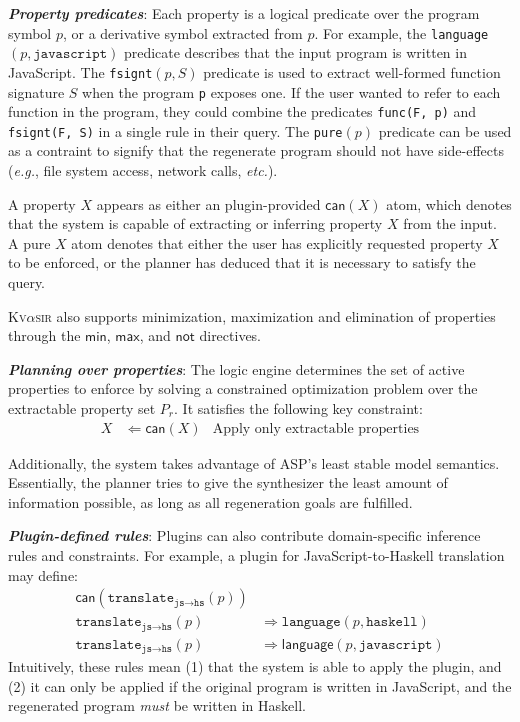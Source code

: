 \documentclass[nonacm,sigplan,review]{acmart}
\def\eg{{\em e.g.}, }
\def\etc{{\em etc.}\xspace}
\newcommand{\sys}{{\scshape Kv{$\alpha$}sir}\xspace}
\newcommand{\heading}[1]{\vspace{2pt}\noindent\textbf{\emph{#1}}:\enspace}
\newcommand{\ttt}[1]{\texttt{#1}\xspace}
\begin{document}



\heading{Property predicates}
Each property is a logical predicate over the program symbol $p$,
or a derivative symbol extracted from $p$.
For example, 
the \ttt{language}$(p, \ttt{javascript})$ predicate describes that the input program is written in JavaScript.
The \ttt{fsignt}$(p, S)$ predicate is used to extract well-formed function signature $S$ when the program \ttt{p} exposes one.
If the user wanted to refer to each function in the program, they could 
combine the predicates \ttt{func(F, p)} and \ttt{fsignt(F, S)} in a single rule in their query.
The \ttt{pure}$(p)$ predicate can be used as a contraint
to signify that the regenerate program
should not have side-effects (\eg file system access, network calls, \etc).

A property $X$ appears as either an
  plugin-provided $\mathsf{can}(X)$ atom, which denotes that the system is capable of extracting or inferring property $X$ from the input.
  A pure $X$ atom denotes that either the user has explicitly requested property $X$ to be enforced, or the planner has deduced that it is necessary to satisfy the query.

\sys also supports minimization, maximization and elimination of properties
through the $\mathsf{min}$, $\mathsf{max}$, and $\mathsf{not}$ directives.

\heading{Planning over properties}
The logic engine determines the set of active properties to enforce by solving
a constrained optimization problem over the extractable property set $P_r$.
It satisfies the
following key constraint:
\begin{align*}
  X &\Leftarrow \mathsf{can}(X) &\text{Apply only extractable properties}
\end{align*}

Additionally, the system takes advantage of ASP's least stable model semantics.
Essentially, the planner tries to give the synthesizer the least amount of information
possible, as long as all regeneration goals are fulfilled.

\heading{Plugin-defined rules}
Plugins can also contribute domain-specific inference rules and constraints.
For example, a plugin for JavaScript-to-Haskell translation may define:
\begin{align*}
\mathsf{can}(\ttt{translate}_{\ttt{js} \rightarrow \ttt{hs}}(p)) & \\
\ttt{translate}_{\ttt{js} \rightarrow \ttt{hs}}(p) &\Rightarrow \ttt{language}(p, \ttt{haskell}) \\
\ttt{translate}_{\ttt{js} \rightarrow \ttt{hs}}(p) &\Rightarrow \mathsf{language}(p, \ttt{javascript})
\end{align*}
Intuitively, these rules mean (1) that the system is able to apply the plugin,
and (2) it can only be applied if the original program is written in JavaScript, 
and the regenerated program \emph{must} be written in Haskell.
\end{document}
